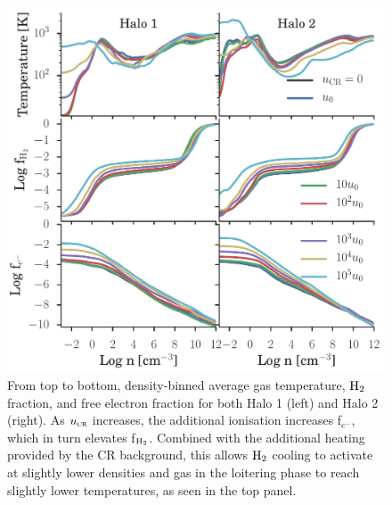 \documentclass[../thesis.tex]{subfiles}
\begin{document}
\begin{figure}
\begin{center}
\includegraphics[width=1\columnwidth]{figures/binned_T_efrac/binned_T_efrac}
\caption{\label{fig:efrac}
From top to bottom, density-binned average gas temperature, $\mathrm{H}_2$ fraction, and free electron fraction for both Halo 1 (left) and Halo 2  (right). 
As ${u}_{\textsc{cr}}$ increases, the additional ionisation increases f$_{e^-}$, which in turn elevates f$_{\mathrm{H}_2}$. 
Combined with the additional heating provided by the CR background, this allows $\mathrm{H}_2$ cooling to activate at slightly lower densities and gas in the loitering phase to reach slightly lower temperatures, as seen in the top panel.%
}
\end{center}
\end{figure}
\end{document}
